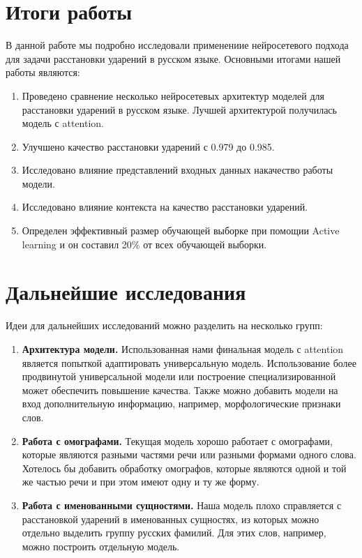 \documentclass[14pt, a4paper, russian]{extreport}
\begin{document}
\section*{Итоги работы}
В данной работе мы подробно исследовали применениие нейросетевого подхода для задачи расстановки ударений в русском языке.  Основными итогами нашей работы являются:
\begin{enumerate}[  1{)}  ]
	\item Проведено сравнение несколько нейросетевых архитектур моделей для расстановки ударений в русском языке. Лучшей архитектурой получилась модель с attention.
	\item Улучшено качество расстановки ударений с 0.979 до 0.985.
	\item Исследовано влияние представлений входных данных накачество работы модели.
	\item Исследовано влияние контекста на качество расстановки ударений.
	\item Определен эффективный размер обучающей выборке при помощии Active learning и он составил 20\% от всех обучающей выборки. 

\end{enumerate}
\section*{Дальнейшие исследования}
Идеи для дальнейших исследований можно разделить на несколько групп:
\begin{enumerate}[ 1{)} ]
	\item \textbf{Архитектура модели.} Использованная нами финальная модель с attention является попыткой адаптировать универсальную модель. Использование более продвинутой универсальной модели или построение специализированной может обеспечить повышение качества. Также можно добавить модели на вход дополнительную информацию, например, морфологические признаки слов.
	\item \textbf{Работа с омографами.}  Текущая модель хорошо работает с омографами, которые являются разными частями речи или разными формами одного слова. Хотелось бы добавить обработку омографов, которые являются одной и той же частью речи и при этом имеют одну и ту же форму.
	\item \textbf{Работа с именованными сущностями.} Наша  модель плохо справляется с расстановкой ударений в именованных сущностях, из которых можно отдельно выделить группу русских фамилий. Для этих слов, например, можно построить отдельную модель.
	
\end{enumerate}
\end{document}
